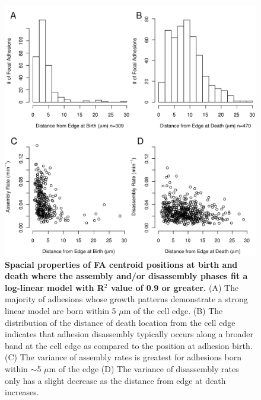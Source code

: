 \begin{figure}[htbp]
\begin{center}
\includegraphics[width=\textwidth]{../figures/spacial/spacial}
\end{center}
\caption{
{\bf Spacial properties of FA centroid positions at birth and death where the
assembly and/or disassembly phases fit a log-linear model with R$^2$ value of
0.9 or greater.} (A) The majority of adhesions whose growth patterns demonstrate
a strong linear model are born within 5 $\mu$m of the cell edge. (B) The
distribution of the distance of death location from the cell edge indicates that
adhesion disassembly typically occurs along a broader band at the cell edge as
compared to the position at adhesion birth. (C) The variance of assembly rates
is greatest for adhesions born within $\sim$5 $\mu$m of the edge (D) The
variance of disassembly rates only has a slight decrease as the distance from
edge at death increases.  
}
\label{spacial}
\end{figure}

